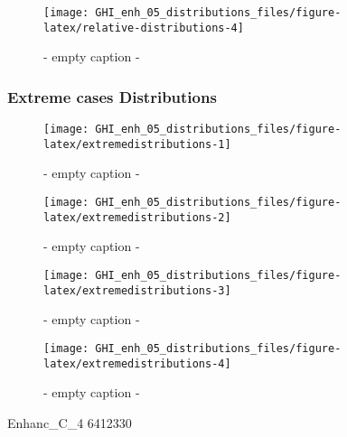 \documentclass[
  10pt,
  a4paper,oneside]{article}
\begin{document}
\begin{figure}[H]

{\centering \texttt{[image: GHI\_enh\_05\_distributions\_files/figure-latex/relative-distributions-4]} 

}

\caption{ - empty caption - }\label{fig:relative-distributions-4}
\end{figure}

\FloatBarrier

\hypertarget{extreme-cases-distributions}{%
\subsubsection{Extreme cases Distributions}\label{extreme-cases-distributions}}

\begin{figure}[H]

{\centering \texttt{[image: GHI\_enh\_05\_distributions\_files/figure-latex/extremedistributions-1]} 

}

\caption{ - empty caption - }\label{fig:extremedistributions-1}
\end{figure}
\begin{figure}[H]

{\centering \texttt{[image: GHI\_enh\_05\_distributions\_files/figure-latex/extremedistributions-2]} 

}

\caption{ - empty caption - }\label{fig:extremedistributions-2}
\end{figure}
\begin{figure}[H]

{\centering \texttt{[image: GHI\_enh\_05\_distributions\_files/figure-latex/extremedistributions-3]} 

}

\caption{ - empty caption - }\label{fig:extremedistributions-3}
\end{figure}
\begin{figure}[H]

{\centering \texttt{[image: GHI\_enh\_05\_distributions\_files/figure-latex/extremedistributions-4]} 

}

\caption{ - empty caption - }\label{fig:extremedistributions-4}
\end{figure}

Enhanc\_C\_4
6412330
\end{document}
